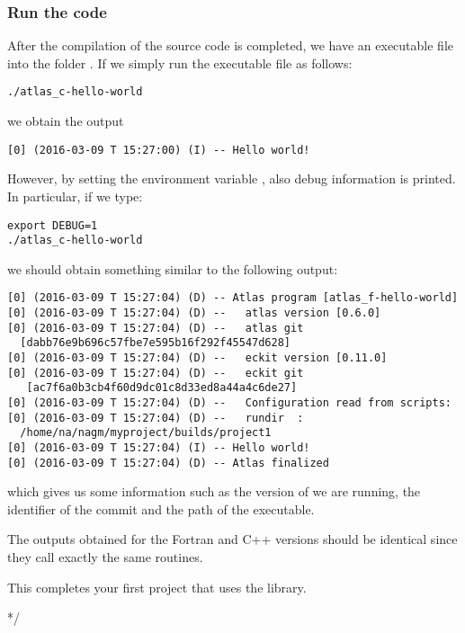 \subsubsection*{Run the code}
After the compilation of the source code is completed, 
we have an executable file into the folder .
If we simply run the executable file as follows:
%
\begin{lstlisting}[style=BashStyle]
./atlas_c-hello-world
\end{lstlisting}
% 
we obtain the output
\begin{lstlisting}[style=BashStyle]
[0] (2016-03-09 T 15:27:00) (I) -- Hello world!
\end{lstlisting}
%
However, by setting the environment variable ,
also debug information is printed.
In particular, if we type:
%
\begin{lstlisting}[style=BashStyle]
export DEBUG=1
./atlas_c-hello-world
\end{lstlisting}
%
we should obtain something similar to the following output:
%
\begin{lstlisting}[style=BashStyle]
[0] (2016-03-09 T 15:27:04) (D) -- Atlas program [atlas_f-hello-world]
[0] (2016-03-09 T 15:27:04) (D) --   atlas version [0.6.0]
[0] (2016-03-09 T 15:27:04) (D) --   atlas git     
  [dabb76e9b696c57fbe7e595b16f292f45547d628]
[0] (2016-03-09 T 15:27:04) (D) --   eckit version [0.11.0]
[0] (2016-03-09 T 15:27:04) (D) --   eckit git    
   [ac7f6a0b3cb4f60d9dc01c8d33ed8a44a4c6de27]
[0] (2016-03-09 T 15:27:04) (D) --   Configuration read from scripts:
[0] (2016-03-09 T 15:27:04) (D) --   rundir  :
  /home/na/nagm/myproject/builds/project1
[0] (2016-03-09 T 15:27:04) (I) -- Hello world!
[0] (2016-03-09 T 15:27:04) (D) -- Atlas finalized

\end{lstlisting}
%
which gives us some information such as the version of \Atlas we are 
running, the identifier of the commit and the path of the executable. 
\begin{tipbox}
The outputs obtained for the Fortran and C++ versions should be identical
since they call exactly the same routines. 
\end{tipbox}

This completes your first project that uses the \Atlas library.






*/